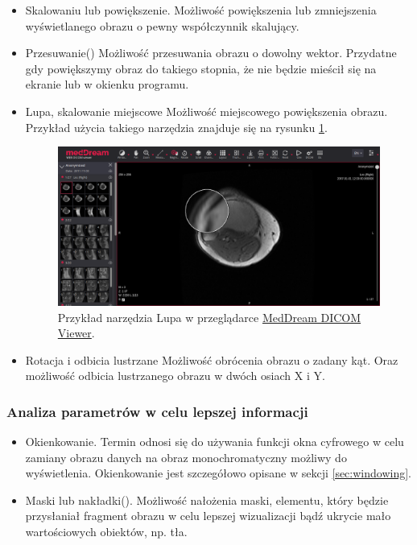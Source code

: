 \begin{itemize}
      \item Skalowaniu lub powiększenie.
            Możliwość powiększenia lub zmniejszenia wyświetlanego obrazu o pewny współczynnik skalujący.

      \item Przesuwanie()
            Możliwość przesuwania obrazu o dowolny wektor.
            Przydatne gdy powiększymy obraz do takiego stopnia, że nie będzie mieścił się na ekranie lub w okienku programu.

      \item Lupa, skalowanie miejscowe
            Możliwość miejscowego powiększenia obrazu.
            Przykład użycia takiego narzędzia znajduje się na rysunku \ref{fig:wyswietlanie001}.

            \begin{figure}[!htbp]
                  \centering
                  \includegraphics[width=\textwidth]{img/wyswietlanie001.png}
                  \caption{Przykład narzędzia Lupa w przeglądarce \href{https://www.softneta.com/products/meddream-dicom-viewer/}{MedDream DICOM Viewer}.}
                  \label{fig:wyswietlanie001}
            \end{figure}

      \item Rotacja i odbicia lustrzane
            Możliwość obrócenia obrazu o zadany kąt.
            Oraz możliwość odbicia lustrzanego obrazu w dwóch osiach X i Y.

\end{itemize}

\subsubsection{Analiza parametrów w celu lepszej informacji}

\begin{itemize}
      \item Okienkowanie.
            Termin odnosi się do używania funkcji okna cyfrowego w celu zamiany obrazu danych na obraz monochromatyczny możliwy do wyświetlenia.
            Okienkowanie jest szczegółowo opisane w sekcji \ref{sec:windowing}.

      \item Maski lub nakładki().
            Możliwość nałożenia maski, elementu, który będzie przysłaniał fragment obrazu w celu lepszej wizualizacji bądź ukrycie mało wartościowych obiektów, np. tła.
\end{itemize}

